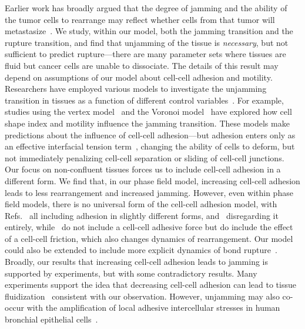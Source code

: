 Earlier work has broadly argued that the degree of jamming and the ability of the tumor cells to rearrange may reflect whether cells from that tumor will metastasize~\cite{ilina2020cell, grosser2021cell, gottheil2023state}.
We study, within our model, both the jamming transition and the rupture transition, and find that unjamming of the tissue is \emph{necessary}, but not sufficient to predict rupture---there are many parameter sets where tissues are fluid but cancer cells are unable to dissociate.
The details of this result may depend on assumptions of our model about cell-cell adhesion and motility.
Researchers have employed various models to investigate the unjamming transition in tissues as a function of different control variables~\cite{bi2016motility, park2015unjamming, lober2015collisions, zhang2020active}.
For example, studies using the vertex model~\cite{park2015unjamming} and the Voronoi model~\cite{bi2016motility} have explored how cell shape index and motility influence the jamming transition.
These models make predictions about the influence of cell-cell adhesion---but adhesion enters only as an effective interfacial tension term~\cite{bi2016motility, manning2010coaction}, changing the ability of cells to deform, but not immediately penalizing cell-cell separation or sliding of cell-cell junctions.
Our focus on non-confluent tissues forces us to include cell-cell adhesion in a different form.
We find that, in our phase field model, increasing cell-cell adhesion leads to less rearrangement and increased jamming.
However, even within phase field models, there is no universal form of the cell-cell adhesion model, with Refs.~\cite{lober2015collisions, zhang2020active, zadeh2022picking, camley2014polarity} all including adhesion in slightly different forms, and~\cite{loewe2020solid} disregarding it entirely, while~\cite{chiang2024multiphase} do not include a cell-cell adhesive force but do include the effect of a cell-cell friction, which also changes dynamics of rearrangement.
Our model could also be extended to include more explicit dynamics of bond rupture~\cite{duque2024rupture, weng2022convergent, mcevoy2022feedback}.
Broadly, our results that increasing cell-cell adhesion leads to jamming is supported by experiments, but with some contradictory results.
Many experiments support the idea that decreasing cell-cell adhesion can lead to tissue fluidization~\cite{blauth2021jamming, lin2025gradients, sadati2013collective, tambe2011collective} consistent with our observation.
However, unjamming may also co-occur with the amplification of local adhesive intercellular stresses in human bronchial epithelial cells~\cite{park2015unjamming}.

